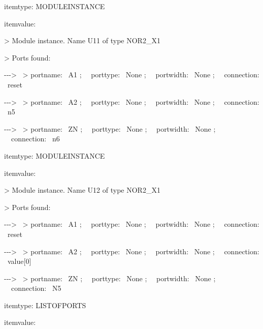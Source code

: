 \documentclass[a4paper]{article}
\begin{document}
\begin{center}
\begin{minipage}{6.04167in}
{\ttfamily\color[rgb]{0.0,0.0,0.039215688}
itemtype: MODULEINSTANCE}

{\ttfamily\color[rgb]{0.0,0.0,0.039215688}
itemvalue:}

{\ttfamily\color[rgb]{0.0,0.0,0.039215688}
{\textgreater} Module instance. Name U11 of type NOR2\_X1}

{\ttfamily\color[rgb]{0.0,0.0,0.039215688}
{\textgreater} Ports found:}

{\ttfamily\color[rgb]{0.0,0.0,0.039215688}
{}-{}-{}-{\textgreater} \ {\textgreater} portname: \ A1 ; \ \ porttype:
\ None ; \ \ portwidth: \ None ; \ \ connection: \ reset}

{\ttfamily\color[rgb]{0.0,0.0,0.039215688}
{}-{}-{}-{\textgreater} \ {\textgreater} portname: \ A2 ; \ \ porttype:
\ None ; \ \ portwidth: \ None ; \ \ connection: \ n5}

{\ttfamily\color[rgb]{0.0,0.0,0.039215688}
{}-{}-{}-{\textgreater} \ {\textgreater} portname: \ ZN ; \ \ porttype:
\ None ; \ \ portwidth: \ None ; \ \ connection: \ n6}


\bigskip

{\ttfamily\color[rgb]{0.0,0.0,0.039215688}
itemtype: MODULEINSTANCE}

{\ttfamily\color[rgb]{0.0,0.0,0.039215688}
itemvalue:}

{\ttfamily\color[rgb]{0.0,0.0,0.039215688}
{\textgreater} Module instance. Name U12 of type NOR2\_X1}

{\ttfamily\color[rgb]{0.0,0.0,0.039215688}
{\textgreater} Ports found:}

{\ttfamily\color[rgb]{0.0,0.0,0.039215688}
{}-{}-{}-{\textgreater} \ {\textgreater} portname: \ A1 ; \ \ porttype:
\ None ; \ \ portwidth: \ None ; \ \ connection: \ reset}

{\ttfamily\color[rgb]{0.0,0.0,0.039215688}
{}-{}-{}-{\textgreater} \ {\textgreater} portname: \ A2 ; \ \ porttype:
\ None ; \ \ portwidth: \ None ; \ \ connection: \ value[0]}

{\ttfamily\color[rgb]{0.0,0.0,0.039215688}
{}-{}-{}-{\textgreater} \ {\textgreater} portname: \ ZN ; \ \ porttype:
\ None ; \ \ portwidth: \ None ; \ \ connection: \ N5}


\bigskip

{\ttfamily\color[rgb]{0.0,0.0,0.039215688}
itemtype: LISTOFPORTS}

{\ttfamily\color[rgb]{0.0,0.0,0.039215688}
itemvalue:}


\end{minipage}
\end{center}
\end{document}
